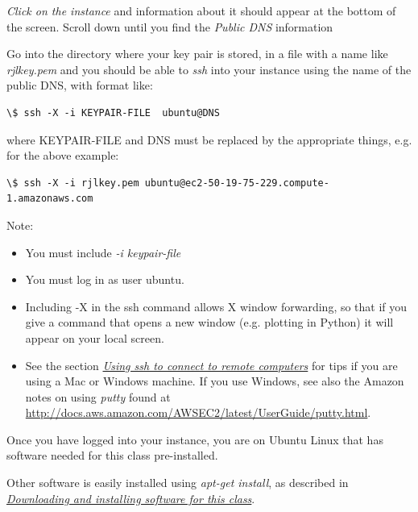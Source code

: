 \documentclass[letterpaper,10pt,english]{sphinxmanual}
\begin{document}
\emph{Click on the instance} and information about it should appear at the bottom
of the screen. Scroll down until you find the \emph{Public DNS} information

Go into the directory where your key pair is stored, in a file with a name
like \emph{rjlkey.pem} and you should be able to \emph{ssh} into your instance using
the name of the public DNS, with format like:

\begin{Verbatim}[commandchars=\\\{\}]
\$ ssh -X -i KEYPAIR-FILE  ubuntu@DNS
\end{Verbatim}

where KEYPAIR-FILE and DNS must be replaced by the appropriate
things, e.g. for the above example:

\begin{Verbatim}[commandchars=\\\{\}]
\$ ssh -X -i rjlkey.pem ubuntu@ec2-50-19-75-229.compute-1.amazonaws.com
\end{Verbatim}

Note:
\begin{itemize}
\item {} 
You must include \emph{-i keypair-file}

\item {} 
You must log in as user ubuntu.

\item {} 
Including -X in the ssh command allows X window forwarding, so that if you
give a command that opens a new window (e.g. plotting in Python) it will
appear on your local screen.

\item {} 
See the section {\hyperref[ssh:ssh]{\emph{Using ssh to connect to remote computers}}} for tips if you are using a Mac or Windows
machine.
If you use Windows, see also the Amazon notes on using \emph{putty} found at
\href{http://docs.aws.amazon.com/AWSEC2/latest/UserGuide/putty.html}{http://docs.aws.amazon.com/AWSEC2/latest/UserGuide/putty.html}.

\end{itemize}

Once you have logged into your instance, you are on Ubuntu Linux that has
software needed for this class pre-installed.

Other software is easily installed using \emph{apt-get install}, as described
in {\hyperref[software_installation:software-installation]{\emph{Downloading and installing software for this class}}}.
\end{document}
